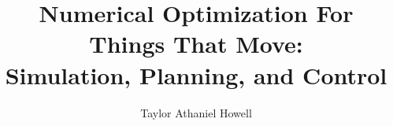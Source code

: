 \documentclass[10pt]{report}
\begin{document}
\title{Numerical Optimization For Things That Move: \\ 
Simulation, Planning, and Control}
\author{Taylor Athaniel Howell}


\beforepreface
%
\afterpreface





 

 



{\small } %


\end{document}
